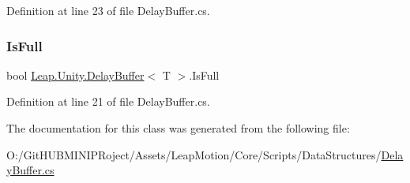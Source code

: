 Definition at line 23 of file Delay\+Buffer.\+cs.

\mbox{\label{class_leap_1_1_unity_1_1_delay_buffer_a1d20ce418e05b09619a0f6629c43e0d4}} 
\subsubsection{\texorpdfstring{IsFull}{IsFull}}
{\footnotesize\ttfamily bool \mbox{\hyperlink{class_leap_1_1_unity_1_1_delay_buffer}{Leap.\+Unity.\+Delay\+Buffer}}$<$ T $>$.Is\+Full\hspace{0.3cm}{\ttfamily [get]}}



Definition at line 21 of file Delay\+Buffer.\+cs.



The documentation for this class was generated from the following file\+:\begin{DoxyCompactItemize}
\item 
O\+:/\+Git\+H\+U\+B\+M\+I\+N\+I\+P\+Roject/\+Assets/\+Leap\+Motion/\+Core/\+Scripts/\+Data\+Structures/\mbox{\hyperlink{_delay_buffer_8cs}{Delay\+Buffer.\+cs}}\end{DoxyCompactItemize}
